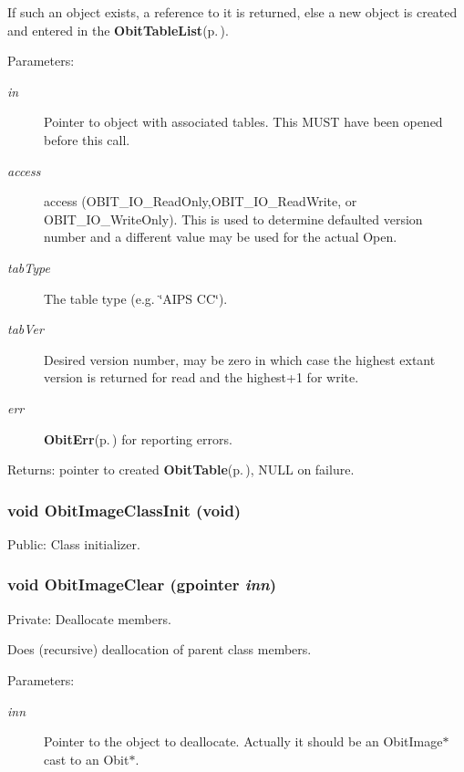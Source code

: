 If such an object exists, a reference to it is returned, else a new object is created and entered in the {\bf Obit\-Table\-List}{\rm (p.\,\pageref{structObitTableList})}. \begin{Desc}
\item[Parameters:]
\begin{description}
\item[{\em in}]Pointer to object with associated tables. This MUST have been opened before this call. \item[{\em access}]access (OBIT\_\-IO\_\-Read\-Only,OBIT\_\-IO\_\-Read\-Write, or OBIT\_\-IO\_\-Write\-Only). This is used to determine defaulted version number and a different value may be used for the actual Open. \item[{\em tab\-Type}]The table type (e.g. \char`\"{}AIPS CC\char`\"{}). \item[{\em tab\-Ver}]Desired version number, may be zero in which case the highest extant version is returned for read and the highest+1 for write. \item[{\em err}]{\bf Obit\-Err}{\rm (p.\,\pageref{structObitErr})} for reporting errors. \end{description}
\end{Desc}
\begin{Desc}
\item[Returns:]pointer to created {\bf Obit\-Table}{\rm (p.\,\pageref{structObitTable})}, NULL on failure. \end{Desc}
\subsubsection{\setlength{\rightskip}{0pt plus 5cm}void Obit\-Image\-Class\-Init (void)}\label{ObitImage_8c_a46}


Public: Class initializer. 

\subsubsection{\setlength{\rightskip}{0pt plus 5cm}void Obit\-Image\-Clear (gpointer {\em inn})}\label{ObitImage_8c_a4}


Private: Deallocate members. 

Does (recursive) deallocation of parent class members. \begin{Desc}
\item[Parameters:]
\begin{description}
\item[{\em inn}]Pointer to the object to deallocate. Actually it should be an Obit\-Image$\ast$ cast to an Obit$\ast$. \end{description}
\end{Desc}
